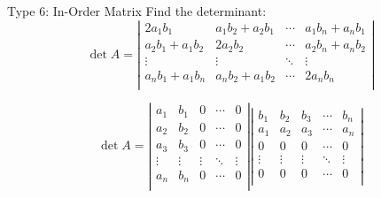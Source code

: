 \documentclass{beamer}
\begin{document}
\begin{frame}{Type 6: In-Order Matrix}
Find the determinant:
\begin{equation*}
    \det A=\left| \begin{matrix}
        2a_1b_1&		a_1b_2+a_2b_1&		\cdots&		a_1b_n+a_nb_1\\
        a_2b_1+a_1b_2&		2a_2b_2&		\cdots&		a_2b_n+a_nb_2\\
        \vdots&		\vdots&		\ddots&		\vdots\\
        a_nb_1+a_1b_n&		a_nb_2+a_1b_2&		\cdots&		2a_nb_n\\
    \end{matrix} \right|
\end{equation*}

\begin{equation*}
    \det A=\left| \begin{matrix}
        a_1&		b_1&		0&		\cdots&		0\\
        a_2&		b_2&		0&		\cdots&		0\\
        a_3&		b_3&		0&		\cdots&		0\\
        \vdots&		\vdots&		\vdots&		\ddots&		\vdots\\
        a_n&		b_n&		0&		\cdots&		0\\
    \end{matrix} \right|\left| \begin{matrix}
        b_1&		b_2&		b_3&		\cdots&		b_n\\
        a_1&		a_2&		a_3&		\cdots&		a_n\\
        0&		0&		0&		\cdots&		0\\
        \vdots&		\vdots&		\vdots&		\ddots&		\vdots\\
        0&		0&		0&		\cdots&		0\\
    \end{matrix} \right|
\end{equation*}
\end{frame}
\end{document}
